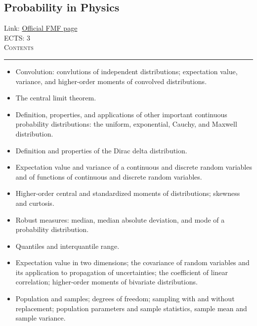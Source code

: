 \documentclass[11pt, a4paper]{article}
\newenvironment{course}[3]{
\subsection{#1}%
Link: \href{#2}{Official FMF page}\\%
ECTS: #3%
\vspace{1ex}
\\
{\large \textsc{Contents}}\\[-0.9ex]%
\rule{\textwidth}{0.5pt}
\vspace{-3ex}
}
{}
\newenvironment{chapter}[1]{
\begin{tcolorbox}[title=#1, breakable]
}
{\end{tcolorbox}}
\begin{document}
\begin{course}{Probability in Physics}{https://www.fmf.uni-lj.si/en/study-physics/programmes/1fiz/2020/7000777/courses/1177/}{3}
\begin{chapter}{Probability distributions}
\begin{itemize}
            \item Convolution: convlutions of independent distributions; expectation value, variance, and higher-order moments of convolved distributions.

            \item The central limit theorem.

            \item Definition, properties, and applications of other important continuous probability distributions: the uniform, exponential, Cauchy, and Maxwell distribution.

            \item Definition and properties of the Dirac delta distribution.

        \end{itemize}
    \end{chapter}

    \begin{chapter}{Quantifying distributions}
        \begin{itemize}
        
            \item Expectation value and variance of a continuous and discrete random variables and of functions of continuous and discrete random variables.

            \item Higher-order central and standardized moments of distributions; skewness and curtosis.

            \item Robust measures: median, median absolute deviation, and mode of a probability distribution.
            
            \item Quantiles and interquantile range.

            \item Expectation value in two dimensions; the covariance of random variables and its application to propagation of uncertainties; the coefficient of linear correlation; higher-order moments of bivariate distributions.

        \end{itemize}
    \end{chapter}

    \begin{chapter}{Introduction to statistics}
        \begin{itemize}
        
            \item Population and samples; degrees of freedom; sampling with and without replacement; population parameters and sample statistics, sample mean and sample variance.
            

\end{itemize}
\end{chapter}
\end{course}
\end{document}
